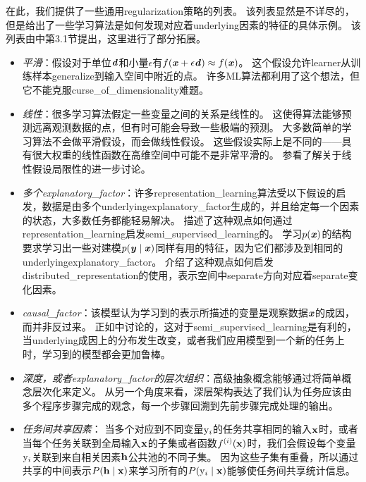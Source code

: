 在此，我们提供了一些通用\gls{regularization}策略的列表。
该列表显然是不详尽的，但是给出了一些学习算法是如何发现对应着\gls{underlying}因素的特征的具体示例。
该列表由\cite{Bengio-Courville-Vincent-TPAMI-2012}中第3.1节提出，这里进行了部分拓展。
\begin{itemize}
	\item \emph{平滑}：假设对于单位$\boldsymbol{\mathit{d}}$和小量$\epsilon$有$f(\boldsymbol{\mathit{x}} + \epsilon \boldsymbol{\mathit{d}}) \approx f(\boldsymbol{\mathit{x}})$。
	这个假设允许\gls{learner}从训练样本\gls{generalize}到输入空间中附近的点。
	许多\gls{ML}算法都利用了这个想法，但它不能克服\gls{curse_of_dimensionality}难题。


	\item \emph{线性}：很多学习算法假定一些变量之间的关系是线性的。
	这使得算法能够预测远离观测数据的点，但有时可能会导致一些极端的预测。
	大多数简单的学习算法不会做平滑假设，而会做线性假设。
	这些假设实际上是不同的——具有很大权重的线性函数在高维空间中可能不是非常平滑的。
	参看\cite{Goodfellow-2015-adversarial}了解关于线性假设局限性的进一步讨论。

	\item \emph{多个\gls{explanatory_factor}}：许多\gls{representation_learning}算法受以下假设的启发，数据是由多个\gls{underlying}\gls{explanatory_factor}生成的，并且给定每一个因素的状态，大多数任务都能轻易解决。
	描述了这种观点如何通过\gls{representation_learning}启发\gls{semi_supervised_learning}的。
	学习$p(\boldsymbol{\mathit{x}})$的结构要求学习出一些对建模$p(\boldsymbol{\mathit{y}}\mid\boldsymbol{\mathit{x}})$同样有用的特征，因为它们都涉及到相同的\gls{underlying}\gls{explanatory_factor}。
	介绍了这种观点如何启发\gls{distributed_representation}的使用，表示空间中\gls{separate}方向对应着\gls{separate}变化因素。


	\item \emph{\gls{causal_factor}}：该模型认为学习到的表示所描述的变量是观察数据$\boldsymbol{\mathit{x}}$的成因，而并非反过来。
	正如中讨论的，这对于\gls{semi_supervised_learning}是有利的，当\gls{underlying}成因上的分布发生改变，或者我们应用模型到一个新的任务上时，学习到的模型都会更加鲁棒。


	\item \emph{深度，或者\gls{explanatory_factor}的层次组织}：高级抽象概念能够通过将简单概念层次化来定义。
	从另一个角度来看，深层架构表达了我们认为任务应该由多个程序步骤完成的观念，每一个步骤回溯到先前步骤完成处理的输出。


	\item \emph{任务间共享因素}：
	当多个对应到不同变量$\mathrm{y}_i$的任务共享相同的输入$\mathbf{x}$时，或者当每个任务关联到全局输入$\mathbf{x}$的子集或者函数$f^{(i)}(\mathbf{x})$时，我们会假设每个变量$\mathrm{y}_i$关联到来自相关因素$\mathbf{h}$公共池的不同子集。
	因为这些子集有重叠，所以通过共享的中间表示$ P(\mathbf{h} \mid \mathbf{x})$来学习所有的$P(\mathrm{y}_i \mid \mathbf{x})$能够使任务间共享统计信息。


\end{itemize}

